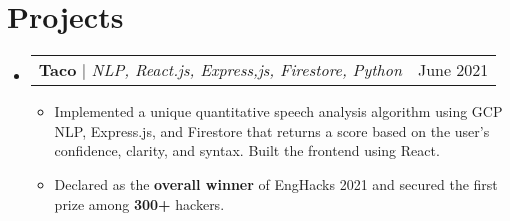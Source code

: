 \documentclass[letterpaper,11pt]{article}
\makeatletter
\renewcommand\small{\normalsize}
\newcommand{\resumeItem}[1]{
  \item\small{
    {#1 \vspace{0pt}}
  }
}
\newcommand{\resumeProjectHeading}[2]{
    \item
    \begin{tabular*}{0.97\textwidth}{l@{\extracolsep{\fill}}r}
      \small#1 & #2 \\
    \end{tabular*}\vspace{-7pt}
}
\newcommand{\resumeSubHeadingListStart}{\begin{itemize}[leftmargin=0.15in, label={}]}
\newcommand{\resumeSubHeadingListEnd}{\end{itemize}}
\newcommand{\resumeItemListStart}{\begin{itemize}}
\newcommand{\resumeItemListEnd}{\end{itemize}\vspace{-5pt}}
\makeatother
\begin{document}
\section{Projects}
    \resumeSubHeadingListStart
      \resumeProjectHeading
    	{\textbf{Taco} $|$ \emph{NLP, React.js, Express,js, Firestore, Python}}{June 2021}
          \resumeItemListStart
            \resumeItem{Implemented a unique quantitative speech analysis algorithm using GCP NLP, Express.js, and Firestore that returns a score based on the user's confidence, clarity, and syntax. Built the frontend using React. }
            \resumeItem{Declared as the \textbf{overall winner} of EngHacks 2021 and secured the first prize among \textbf{300+} hackers.}
          \resumeItemListEnd
          \resumeItemListEnd
\end{document}
